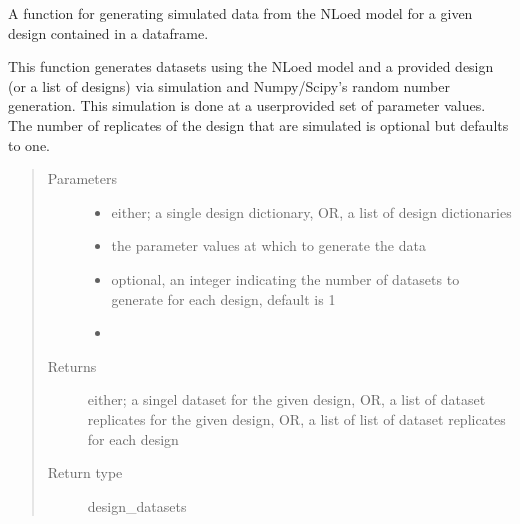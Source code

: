 \documentclass[letterpaper,10pt,english,openany,oneside]{sphinxmanual}
\begin{document}
\begin{fulllineitems}
\begin{fulllineitems}
\end{fulllineitems}


\begin{fulllineitems}
\label{\detokenize{nloed:nloed.model.Model.sample}}
A function for generating simulated data from the NLoed model for a given design contained in a dataframe.

This function generates datasets using the NLoed model and a provided design (or a list of
designs) via simulation and Numpy/Scipy’s random number generation. This simulation is done
at a user\sphinxhyphen{}provided set of parameter values. The number of replicates of the design that are
simulated is optional but defaults to one.
\begin{quote}\begin{description}
\item[{Parameters}] \leavevmode\begin{itemize}
\item {} 
 \textendash{} either; a single design dictionary, OR, a list of design dictionaries

\item {} 
 \textendash{} the parameter values at which to generate the data

\item {} 
 \textendash{} optional,  an integer indicating the number of datasets to generate for each design,  default is 1

\item {} 
 \textendash{} 

\end{itemize}

\item[{Returns}] \leavevmode
either; a singel dataset for the given design,  OR,  a list of dataset replicates for the given design,  OR,  a list of list of dataset replicates for each design

\item[{Return type}] \leavevmode
design\_datasets


\end{description}
\end{quote}
\end{fulllineitems}
\end{fulllineitems}
\end{document}
